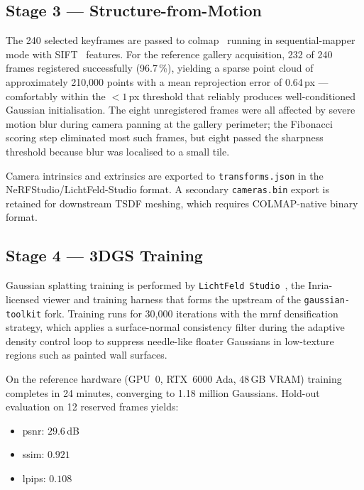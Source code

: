 \subsection{Stage 3 — Structure-from-Motion}

The 240 selected keyframes are passed to \acrshort{colmap}~\citep{Schoenberger2016sfm,
Schoenberger2016mvs} running in sequential-mapper mode with SIFT~\citep{Lowe2004} features.
For the reference gallery acquisition, 232 of 240 frames registered successfully
(96.7\,\%), yielding a sparse point cloud of approximately 210,000 points with a
mean reprojection error of 0.64\,px — comfortably within the $<1$\,px threshold that
reliably produces well-conditioned Gaussian initialisation. The eight unregistered frames
were all affected by severe motion blur during camera panning at the gallery perimeter;
the Fibonacci scoring step eliminated most such frames, but eight passed the sharpness
threshold because blur was localised to a small tile.

Camera intrinsics and extrinsics are exported to \texttt{transforms.json} in the
NeRFStudio/\allowbreak{}LichtFeld-Studio format. A secondary \texttt{cameras.bin} export
is retained for downstream TSDF meshing, which requires COLMAP-native binary format.

\subsection{Stage 4 — 3DGS Training}

Gaussian splatting training is performed by \texttt{LichtFeld Studio}~\citep{LichtFeldStudio2026},
the Inria-licensed viewer and training harness that forms the upstream of the
\texttt{gaussian-toolkit} fork. Training runs for 30,000 iterations with the
\acrfull{mrnf} densification strategy, which applies a surface-normal consistency
filter during the adaptive density control loop to suppress needle-like floater Gaussians
in low-texture regions such as painted wall surfaces.

On the reference hardware (GPU~0, RTX~6000 Ada, 48\,GB VRAM) training completes in
24 minutes, converging to 1.18 million Gaussians. Hold-out evaluation on 12 reserved
frames yields:

\begin{itemize}
  \item \acrshort{psnr}: $29.6$\,dB
  \item \acrshort{ssim}: $0.921$
  \item \acrshort{lpips}: $0.108$
\end{itemize}


